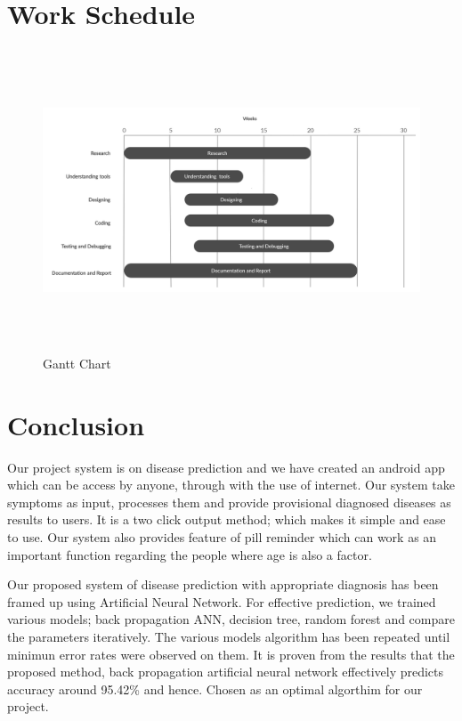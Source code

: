 {\section{Work Schedule}
\begin{figure}[H]
\includegraphics[width=150mm,height=90mm]{images/ganttchartnew.jpg}
 \caption{Gantt Chart}
\end{figure}



\section{Conclusion}
 
Our project system is on disease prediction and we have created an android app 
which can be access by anyone, through with the use of internet. Our system take 
symptoms as input, processes them and provide provisional diagnosed diseases as 
results to users. It is a two click output method; which makes it simple and ease to use. 
Our system also provides feature of pill reminder which can work as an important function 
regarding the people where age is also a factor.\par

Our proposed system of disease prediction with appropriate diagnosis has been framed
up using Artificial Neural Network. For effective prediction, we trained various models;
back propagation ANN, decision tree, random forest and compare the parameters iteratively. 
The various models algorithm has been repeated until minimun error rates were observed 
on them. It is proven from the results that the proposed method, back propagation artificial 
neural network effectively predicts accuracy around 95.42\% and hence. Chosen as an optimal algorthim for our project.\par

}
